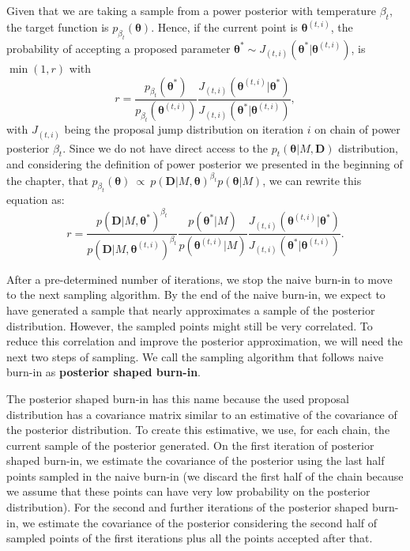 Given that we are taking a sample from a power posterior with 
temperature $\beta_t$, the target function is  $p_{\beta_t} ({\bm
\theta})$. Hence, if the current point is ${\bm \theta}^{(t, i)}$, the 
probability of accepting a proposed parameter 
${\bm \theta}^* \sim J_{(t, i)} ({\bm \theta}^* | {\bm \theta}^{(t,
i)})$, is $\min (1, r)$ with
\begin{equation*}
    r = \frac{p_{\beta_t} ({\bm \theta}^*)}
             {p_{\beta_t} ({\bm \theta}^{(t, i)})}
        \frac{J_{(t, i)} ({\bm \theta}^{(t, i)} | {\bm \theta}^*)}
             {J_{(t, i)} ({\bm \theta}^* | {\bm \theta}^{(t, i)})},
\end{equation*}
with $J_{(t, i)}$ being the proposal jump distribution on iteration $i$ 
on chain of power posterior $\beta_t$. Since we do not have direct
access to the $p_t({\bm \theta} | M, {\bm D})$ distribution, and
considering the definition of power posterior we presented in the 
beginning of the chapter, that $p_{\beta_t} ({\bm \theta})~\propto~p
({\bm D}|M, {\bm \theta})^{\beta_t} p ({\bm \theta} | M)$, we can 
rewrite this equation as:
\begin{equation}
    r = \frac{p ({\bm D} | M, {\bm \theta}^*)^{\beta_t}}
             {p ({\bm D} | M, {\bm \theta}^{(t, i)})^{\beta_t}}
        \frac{p ({\bm \theta}^* | M)}
             {p ({\bm \theta}^{(t, i)} | M)}
        \frac{J_{(t, i)} ({\bm \theta}^{(t, i)} | {\bm \theta}^*)}
             {J_{(t, i)} ({\bm \theta}^* | {\bm \theta}^{(t, i)})}.
    \label{eq:mh_ratio_step1}
\end{equation}

After a pre-determined number of iterations, we stop the naive burn-in
to move to the next sampling algorithm. By the end of the naive burn-in,
we expect to have generated a sample that nearly approximates a sample
of the posterior distribution. However, the sampled points might still
be very correlated. To reduce this correlation and improve the posterior
approximation, we will need the next two steps of sampling. We call the 
sampling algorithm that follows naive burn-in as {\bf posterior shaped
burn-in}.

The posterior shaped burn-in has this name because the used proposal
distribution has a covariance matrix similar to an estimative of the 
covariance of the posterior distribution. To create this estimative, we 
use, for each chain, the current sample of the posterior generated. On 
the first iteration of posterior shaped burn-in, we estimate the 
covariance of the posterior using the last half points sampled in the 
naive burn-in (we discard the first half of the chain because we assume 
that these points can have very low probability on the posterior 
distribution). For the second and further iterations of the posterior
shaped burn-in, we estimate the covariance of the posterior considering
the second half of sampled points of the first iterations plus all the
points accepted after that.

